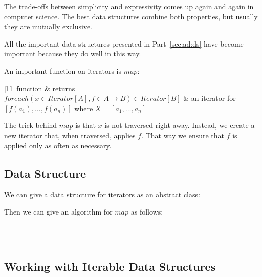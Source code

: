 \begin{remark}
The trade-offs between simplicity and expressivity comes up again and again in computer science.
The best data structures combine both properties, but usually they are mutually exclusive.

All the important data structures presented in Part~\ref{sec:ad:ds} have become important because they do well in this way.
\end{remark}

An important function on iterators is $map$:
\begin{ctabular}{|l|l|}
\hline
function & returns \\
\hline
$foreach(x\in Iterator[A],f\in A\to B)\in Iterator[B]$ & an iterator for $[f(a_1),\ldots,f(a_n)]$ where $X=[a_1,\ldots,a_n]$ \\
\hline
\end{ctabular}

The trick behind $map$ is that $x$ is not traversed right away.
Instead, we create a new iterator that, when traversed, applies $f$.
That way we ensure that $f$ is applied only as often as necessary.

\subsection{Data Structure}

We can give a data structure for iterators as an abstract class:
\begin{acode}
\end{acode}

Then we can give an algorithm for $map$ as follows:
\begin{acode}
\\
\\
\end{acode}

\subsection{Working with Iterable Data Structures}\label{sec:ad:iter:use}

